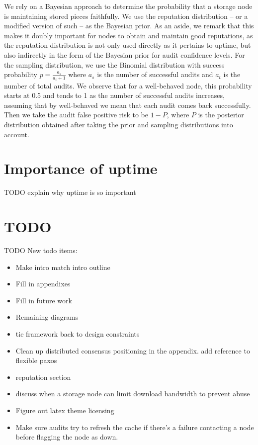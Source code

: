 \documentclass[11pt,fleqn,openany]{book}
\newcommand{\todo}[1]{{\color{red} TODO #1 }}
\begin{document}
We rely on a Bayesian approach to determine the probability 
that a storage node is maintaining stored pieces faithfully. 
We use the reputation distribution -- or a modified version of such -- 
as the Bayesian prior. As an aside, we remark that this makes it doubly important 
for nodes to obtain and maintain good reputations, 
as the reputation distribution is not only used directly as it pertains to uptime, 
but also indirectly in the form of the Bayesian prior for audit confidence levels. 
For the sampling distribution, we use the Binomial distribution with 
success probability $p=\frac{a_s}{a_t+1}$ where $a_s$ is the number of 
successful audits and $a_t$ is the number of total audits. 
We observe that for a well-behaved node, this probability starts at 0.5 
and tends to 1 as the number of successful audits increases, 
assuming that by well-behaved we mean that each audit comes back successfully. 
Then we take the audit false positive risk to be $1-P$, 
where $P$ is the posterior distribution obtained after taking the 
prior and sampling distributions into account.

\chapter{Importance of uptime}\label{appendix:uptime-importance}

\todo{explain why uptime is so important}

\chapter{TODO}

\todo{
New todo items:
\begin{itemize}
\item Make intro match intro outline
\item Fill in appendixes
\item Fill in future work
\item Remaining diagrams
\item tie framework back to design constraints
\item Clean up distributed consensus positioning in the appendix.
  add reference to flexible paxos
\item reputation section
\item discuss when a storage node can limit download bandwidth to prevent
  abuse
\item Figure out latex theme licensing
\item Make sure audits try to refresh the cache if there's a failure contacting
  a node before flagging the node as down.
\end{itemize}
}

\newpage

\begingroup
\raggedright

\endgroup
\end{document}

